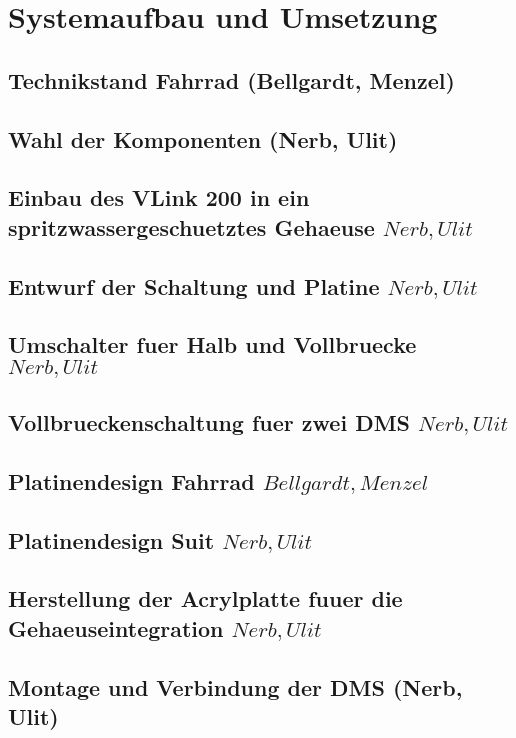 \chapter{Systemaufbau und Umsetzung}

\section{Technikstand Fahrrad (Bellgardt, Menzel)}
\section{Wahl der Komponenten (Nerb, Ulit)}


\section{Einbau des V\-Link 200 in ein spritzwassergeschuetztes Gehaeuse \(Nerb, Ulit\)}
\section{Entwurf der Schaltung und Platine \(Nerb, Ulit\)}
\section{Umschalter fuer Halb\- und Vollbruecke \(Nerb, Ulit\)}
\section{Vollbrueckenschaltung fuer zwei DMS \(Nerb, Ulit\)}
\section{Platinendesign Fahrrad \(Bellgardt, Menzel\)}
\section{Platinendesign Suit \(Nerb, Ulit\)}
\section{Herstellung der Acrylplatte fuuer die Gehaeuseintegration \(Nerb, Ulit\)}
\section{Montage und Verbindung der DMS (Nerb, Ulit)}
